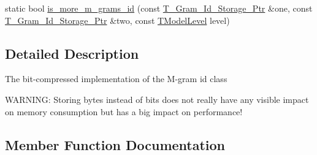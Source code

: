 \begin{DoxyCompactItemize}
\item 
static bool \hyperlink{structuva_1_1smt_1_1tries_1_1mgrams_1_1_bit___m___gram___id_ade6ca5b4182888c32eefae41b768ce8d}{is\+\_\+more\+\_\+m\+\_\+grams\+\_\+id} (const \hyperlink{namespaceuva_1_1smt_1_1tries_1_1mgrams_1_1_m___gram___id_a478e6468dbd5dab37599c566d77c845c}{T\+\_\+\+Gram\+\_\+\+Id\+\_\+\+Storage\+\_\+\+Ptr} \&one, const \hyperlink{namespaceuva_1_1smt_1_1tries_1_1mgrams_1_1_m___gram___id_a478e6468dbd5dab37599c566d77c845c}{T\+\_\+\+Gram\+\_\+\+Id\+\_\+\+Storage\+\_\+\+Ptr} \&two, const \hyperlink{namespaceuva_1_1smt_1_1tries_a20577a44b3a42d26524250634379b7cb}{T\+Model\+Level} level)
\end{DoxyCompactItemize}


\subsection{Detailed Description}
The bit-\/compressed implementation of the M-\/gram id class

W\+A\+R\+N\+I\+N\+G\+: Storing bytes instead of bits does not really have any visible impact on memory consumption but has a big impact on performance! 

\subsection{Member Function Documentation}
\hypertarget{structuva_1_1smt_1_1tries_1_1mgrams_1_1_bit___m___gram___id_a4a369d73d7d212b8ba5257d9a79cc753}{}
